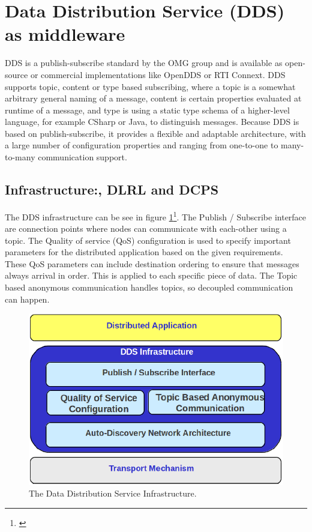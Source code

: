 \section{Data Distribution Service (DDS) as middleware}

DDS is a publish-subscribe standard by the OMG group and is available as open-source or commercial implementations like OpenDDS or RTI Connext. DDS supports topic, content or type based subscribing, where a topic is a somewhat arbitrary general naming of a message, content is certain properties evaluated at runtime of a message, and type is using a static type schema of a higher-level language, for example CSharp or Java, to distinguish messages. Because DDS is based on publish-subscribe, it provides a flexible and adaptable architecture, with a large number of configuration properties and ranging from one-to-one to many-to-many communication support.

\subsection{Infrastructure:, DLRL and DCPS}
The DDS infrastructure can be see in figure \ref{fig:DDSIinfrastructure}\footnote{\cite{Lopez-Vega2013}}. The Publish / Subscribe interface are connection points where nodes can communicate with each-other using a topic. The Quality of service (QoS) configuration is used to specify important parameters for the distributed application based on the given requirements. These QoS parameters can include destination ordering to ensure that messages always arrival in order. This is applied to each specific piece of data. The Topic based anonymous communication handles topics, so decoupled communication can happen.

\begin{figure}[H]
	\centering
	\includegraphics[scale=0.8]{middleware/DDSIinfrastructure.png}
	\caption{The Data Distribution Service Infrastructure.}
	\label{fig:DDSIinfrastructure}
\end{figure}

